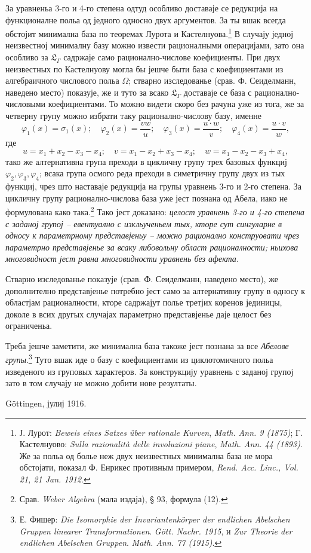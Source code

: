﻿\documentclass[11pt]{article}
\begin{document}
За уравненьа 3-го и 4-го степена одтуд особливо доставаје се редукција на функционалне польа од једного односно двух аргументов. За ты вшак всегда обстојит минимална база по теоремах Лурота и Кастелнуова.\footnote{Ј. Лурот: \emph{Beweis eines Satzes über rationale Kurven}, \emph{Math. Ann. 9 (1875)}; Г. Кастелнуово: \emph{Sulla razionalità delle involuzioni piane}, \emph{Math. Ann. 44 (1893)}. Же за польа од болье неж двух неизвестных минимална база не мора обстојати, показал Ф. Енрикес противным примером, \emph{Rend. Acc. Linc., Vol. 21, 21 Jan. 1912}.} В случају једној неизвестној минималну базу можно извести рационалными операцијами, зато она особливо за $\mathfrak L_\Gamma$ садржаје само рационално-числове коефициенты. При двух неизвестных по Кастелнуову могла бы јешче быти база с коефициентами из алгебраичного числового польа $\Omega$; стварно изследованье (срав. Ф. Сеиделманн, наведено место) показује, же и туто за всако $\mathfrak L_\Gamma$ доставаје се база с рационално-числовыми коефициентами. То можно видети скоро без рачуна уже из тога, же за четверну групу можно избрати таку рационално-числову базу, именне
\[
\varphi_1(x)=\sigma_1(x);\quad \varphi_2(x)=\frac{v w}{u};\quad \varphi_3(x)=\frac{u\cdot w}{v};\quad \varphi_4(x)=\frac{u\cdot v}{w},
\]
где
\[
u=x_1+x_2-x_3-x_4;\quad v=x_1-x_2+x_3-x_4;\quad w=x_1-x_2-x_3+x_4,
\]
тако же алтернативна група преходи в цикличну групу трех базовых функциј $\varphi_2,\varphi_3,\varphi_4$; всака група осмого реда преходи в симетричну групу двух из тых функциј, чрез што наставаје редукција на групы уравнень 3-го и 2-го степена. За цикличну групу рационално-числова база уже јест познана од Абела, иако не формулована како така.\footnote{Срав. \emph{Weber Algebra} (мала издаја), § 93, формула (12).} Тако јест доказано: {\itshape целост уравнень 3-го и 4-го степена с заданој групој -- евентуално с изкльученьем тых, кторе сут сингуларне в односу к параметрному представјеньу -- можно рационално конструовати чрез параметрно представјенье за всаку либовольну област рационалности; ньихова многовидност јест равна многовидности уравнень без афекта.}

Стварно изследованье показује (срав. Ф. Сеиделманн, наведено место), же дополнително представјенье потребно јест само за алтернативну групу в односу к областјам рационалности, кторе садржајут полье третјих коренов јединицы, доколе в всих другых случајах параметрно представјенье даје целост без ограниченьа.

Треба јешче заметити, же минимална база такоже јест познана за все {\itshape Абелове групы}.\footnote{Е. Фишер: \emph{Die Isomorphie der Invariantenkörper der endlichen Abelschen Gruppen linearer Transformationen}. \emph{Gött. Nachr. 1915}, и \emph{Zur Theorie der endlichen Abelschen Gruppen}. \emph{Math. Ann. 77 (1915)}.} Туто вшак иде о базу с коефициентами из циклотомичного польа изведеного из груповых характеров. За конструкцију уравнень с заданој групој зато в том случају не можно добити нове резултаты.

\mbox{Göttingen}, јулиј 1916.

\clearpage
\end{document}
